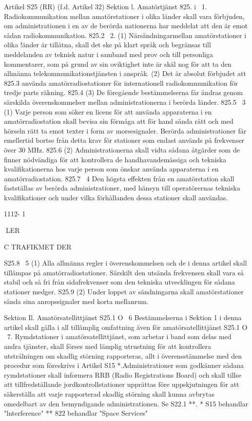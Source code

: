 Artikel S25 (RR) (f.d. Artikel 32)
Sektion l. Amatörtjänst
825. i \  1. Radiokommunikation mellan
amatörstationer i olika länder skall vara förbjuden, om administrationen i en av de berörda nationerna har meddelat att den är
emot sådan radiokommunikation.
825.2 \  2. (1) Närsändningarmellan amatörstationer i olika !änder är tillåtna, skall det
ske på klart språk och begränsas till meddelanden av teknisk natur i samband med prov
och till personliga kommentarer, som på
grund av sin oviktighet inte är skäl nog för att
ta den allmänna telekommunikationstjänsten i anspråk.
(2) Det är absolut förbjudet att
825.3
använda amatörradiostationer för internationell radiokommunikation för tredje parts
räkning.
825.4
(3) De föregående bestämmelserna får ändras genom särskilda överenskommelser mellan administrationerna i berörda länder.
825.5 \ 3
(1) Varje person som söker en
licens för att använda apparaterna i en
amatörradiostation skall bevisa sin förmåga
att för hand sända rätt och med hörseln rätt
ta emot texter i form av morsesignaler. Berörda administrationer får emellertid bortse
från detta krav för stationer som endast
används på frekvenser över 30 MHz.
825.6
(2) Administrationerna skall vidta sådana åtgärder som de finner nödvändiga för att kontrollera de handhavandemässiga och tekniska kvalifikationerna hos varje
person som önskar använda apparaterna i
en amatörradiostation.
825.7 \ 4
Den högsta effekten från en
amatörstation skall fastställas av berörda
administrationer, med hänsyn till operatörernas tekniska kvalifikationer och under vilka förhållanden dessa stationer skall användas.

1112- 1

LER

C TRAFIKMET DER

S25.8 \ 5
(1) Alla allmänna regler i överenskommelsen och de i denna artikel skall
tillämpas på amatörradiostationer. Särskilt
den utsända frekvensen skall vara så stabil
och så fri från sidafrekvenser som den tekniska utvecklingen för sådana stationer medger.
S25.9
(2) Under loppet av sändningarna skall amatörstationer sända sina anropssignaler med korta mellanrum.

Sektion Il. Amatörsatellittjänst
S25.1 O \ 6 Bestämmelserna i Sektion 1 i
denna artikel skall gälla i all tillämplig omfattning även för amatörsatellittjänst
S25.1 O \ 7. Rymdstationer i amatörsatellittjänst, som arbetar i band som delas med
andra tjänster, skall förses med lämplig utrustning för att kontrollera utstrålningen om
skadlig störning rapporteras, allt i överensstämmelse med den procedur som föreskrivs i Artikel S15 *.Administrationer som
godkänner sådana rymdstationer skall informera RRB (Radio Registrations Board)
och skall tillse att tillfredställande jordkontrollstationer upprättas före uppskjutningen för
att säkerställa att varje rapporterad skadlig
störning skall kunna avbrytas omedelbart av
den bemyndigande administrationen. Se
S22.1 **.
* S15 behandlar "lnterference"
** 822 behandlar "Space Services"

